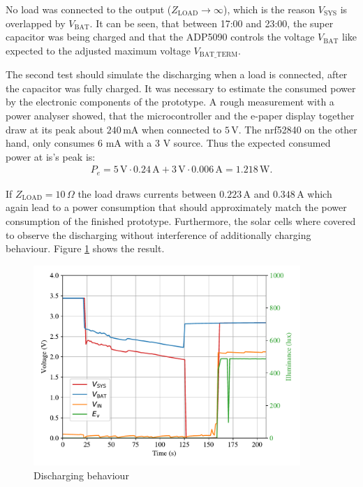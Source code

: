 No load was connected to the output ($Z_\text{LOAD} \to \infty$), which is the reason $V_{\text{SYS}}$ is overlapped by $V_{\text{BAT}}$.
It can be seen, that between 17:00 and 23:00, the super capacitor was being charged and
that the ADP5090 controls the voltage $V_{\text{BAT}}$ like expected to the adjusted maximum voltage $V_{\text{BAT\_TERM}}$.

The second test should simulate the discharging when a load is connected, after the capacitor was fully charged.
It was necessary to estimate the consumed power by the electronic components of the prototype.
A rough measurement with a power analyser showed, that the microcontroller and the e-paper display together draw at its peak about $240\,\text{mA}$ when connected to $5\,\text{V}$. The nrf52840 on the other hand, only consumes 6 mA with a 3 V source. Thus the expected consumed power at is's peak is:
\begin{align}
	P_{e} = 5\,\text{V}\cdot 0.24\,\text{A} + 3\,\text{V}\cdot 0.006\,\text{A} = 1.218\,\text{W}.
\end{align}
  

If $Z_{\text{LOAD}}=10\,\Omega$ the load draws currents between $0.223\,\text{A}$ and $0.348\,\text{A}$ which again lead to a power consumption that should approximately match the power consumption of the finished prototype.
Furthermore, the solar cells where covered to observe the discharging without interference of additionally charging behaviour.
Figure \ref{development:discharge} shows the result.
 
\begin{figure}[ht]
	\centering
	\includegraphics[width=0.9\textwidth]{4-development/hardware/graphics/entladen.pdf}
	\caption{Discharging behaviour\label{development:discharge}}
\end{figure}

